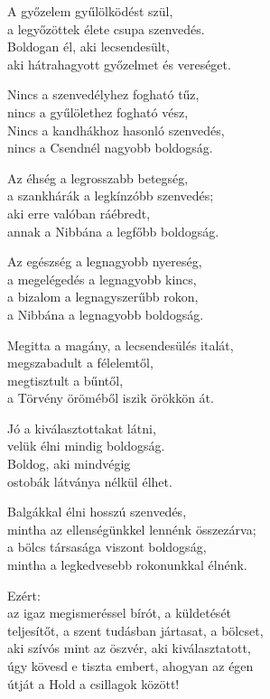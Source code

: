 \begin{dhpverse}

 A győzelem gyűlölködést szül,\\
a legyőzöttek élete csupa szenvedés.\\
Boldogan él, aki lecsendesült,\\
aki hátrahagyott győzelmet és vereséget.

 Nincs a szenvedélyhez fogható tűz,\\
nincs a gyűlölethez fogható vész,\\
Nincs a kandhákhoz hasonló szenvedés,\\
nincs a Csendnél nagyobb boldogság.

 Az éhség a legrosszabb betegség,\\
a szankhárák a legkínzóbb szenvedés;\\
aki erre valóban ráébredt,\\
annak a Nibbána a legfőbb boldogság.

 Az egészség a legnagyobb nyereség,\\
a megelégedés a legnagyobb kincs,\\
a bizalom a legnagyszerűbb rokon,\\
a Nibbána a legnagyobb boldogság.

 Megitta a magány, a lecsendesülés italát,\\
megszabadult a félelemtől,\\
megtisztult a bűntől,\\
a Törvény öröméből iszik örökkön át.

 Jó a kiválasztottakat látni,\\
velük élni mindig boldogság.\\
Boldog, aki mindvégig\\
ostobák látványa nélkül élhet.

\end{dhpverse}
\newpage
\begin{dhpverse}

 Balgákkal élni hosszú szenvedés,\\
mintha az ellenségünkkel lennénk összezárva;\\
a bölcs társasága viszont boldogság,\\
mintha a legkedvesebb rokonunkkal élnénk.

 Ezért:\\
az igaz megismeréssel bírót, a küldetését\\
teljesítőt, a szent tudásban jártasat, a bölcset,\\
aki szívós mint az öszvér, aki kiválasztatott,\\
úgy kövesd e tiszta embert, ahogyan az égen\\
útját a Hold a csillagok között!

\end{dhpverse}
